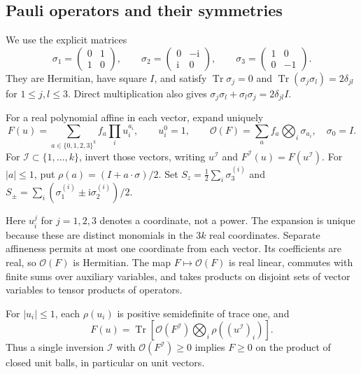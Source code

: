 \subsection{Pauli operators and their symmetries}

We use the explicit matrices
\[
 \sigma_1=\begin{pmatrix}0&1\\1&0\end{pmatrix},\qquad
 \sigma_2=\begin{pmatrix}0&-\mathrm i\\\mathrm i&0\end{pmatrix},\qquad
 \sigma_3=\begin{pmatrix}1&0\\0&-1\end{pmatrix}.
\]
They are Hermitian, have square \(I\), and satisfy
\(\operatorname{Tr}\sigma_j=0\) and
\(\operatorname{Tr}(\sigma_j\sigma_l)=2\delta_{jl}\)
for \(1\le j,l\le3\).  Direct multiplication also gives
\(\sigma_j\sigma_l+\sigma_l\sigma_j=2\delta_{jl}I\).

\begin{definition}\label{d:Pauli}
For a real polynomial affine in each vector, expand uniquely
\[
 F(u)=\sum_{a\in\{0,1,2,3\}^k}f_a\prod_i u_i^{a_i},
 \qquad u_i^0=1,\qquad
 \mathcal O(F)=\sum_a f_a\bigotimes_i\sigma_{a_i},\quad\sigma_0=I.
\]
For \(\mathcal I\subset\{1,\ldots,k\}\), invert those vectors,
writing \(u^{\mathcal I}\) and \(F^{\mathcal I}(u)=F(u^{\mathcal I})\).
For \(|a|\le1\), put \(\rho(a)=(I+a\cdot\sigma)/2\).
Set \(S_z=\frac12\sum_i\sigma_3^{(i)}\) and
\(S_\pm=\sum_i(\sigma_1^{(i)}\pm\mathrm i\sigma_2^{(i)})/2\).
\end{definition}

Here \(u_i^j\) for \(j=1,2,3\) denotes a coordinate, not a power.
The expansion is unique because these are distinct monomials
in the \(3k\) real coordinates.  Separate affineness permits
at most one coordinate from each vector.  Its coefficients are
real, so \(\mathcal O(F)\) is Hermitian.  The map
\(F\mapsto\mathcal O(F)\) is real linear, commutes with finite
sums over auxiliary variables, and takes products on disjoint
sets of vector variables to tensor products of operators.

\begin{lemma}\label{l:inversion}
For \(|u_i|\le1\), each \(\rho(u_i)\) is positive semidefinite
of trace one, and
\[
 F(u)=\operatorname{Tr}\!\left[
      \mathcal O(F^{\mathcal I})
                 \bigotimes_i\rho((u^{\mathcal I})_i)\right].
\]
Thus a single inversion \(\mathcal I\) with
\(\mathcal O(F^{\mathcal I})\ge0\) implies \(F\ge0\)
on the product of closed unit balls, in particular on unit vectors.
\end{lemma}

